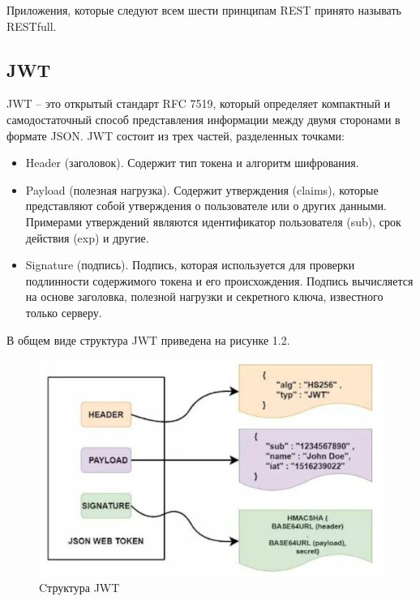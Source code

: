 Приложения, которые следуют всем шести принципам REST принято называть RESTfull.



\subsection{JWT}\label{subsec:domain:jwt}
JWT -- это открытый стандарт RFC 7519, который определяет компактный и самодостаточный способ представления информации между двумя сторонами в формате JSON.
JWT состоит из трех частей, разделенных точками:
\begin{itemize}
    \item Header (заголовок).
    Содержит тип токена и алгоритм шифрования.
    \item Payload (полезная нагрузка).
    Содержит утверждения (claims), которые представляют собой утверждения о пользователе или о других данными.
    Примерами утверждений являются идентификатор пользователя (sub), срок действия (exp) и другие.
    \item Signature (подпись).
    Подпись, которая используется для проверки подлинности содержимого токена и его происхождения.
    Подпись вычисляется на основе заголовка, полезной нагрузки и секретного ключа, известного только серверу.
\end{itemize}

В общем виде структура JWT приведена на рисунке 1.2.

\begin{figure}[ht]
    \centering
    \includegraphics[width=.8\linewidth]{images/jwt_struct}
    \caption{Cтруктура JWT}
    \label{fig:domain:jwt-structure}
\end{figure}


